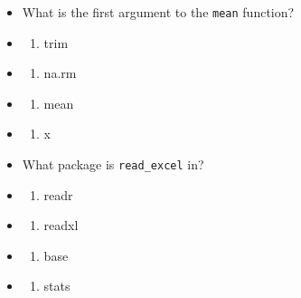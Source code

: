 \documentclass[
  oneside]{book}
\providecommand{\tightlist}{%
  \setlength{\itemsep}{0pt}\setlength{\parskip}{0pt}}
\begin{document}
\begin{try}
\begin{itemize}
\item
  What is the first argument to the \texttt{mean} function?
\item
  \begin{enumerate}
  \def\labelenumi{(\Alph{enumi})}
  \tightlist
  \item
    trim\\
  \end{enumerate}
\item
  \begin{enumerate}
  \def\labelenumi{(\Alph{enumi})}
  \setcounter{enumi}{1}
  \tightlist
  \item
    na.rm\\
  \end{enumerate}
\item
  \begin{enumerate}
  \def\labelenumi{(\Alph{enumi})}
  \setcounter{enumi}{2}
  \tightlist
  \item
    mean\\
  \end{enumerate}
\item
  \begin{enumerate}
  \def\labelenumi{(\Alph{enumi})}
  \setcounter{enumi}{3}
  \tightlist
  \item
    x
  \end{enumerate}
\item
  What package is \texttt{read\_excel} in?
\item
  \begin{enumerate}
  \def\labelenumi{(\Alph{enumi})}
  \tightlist
  \item
    readr\\
  \end{enumerate}
\item
  \begin{enumerate}
  \def\labelenumi{(\Alph{enumi})}
  \setcounter{enumi}{1}
  \tightlist
  \item
    readxl\\
  \end{enumerate}
\item
  \begin{enumerate}
  \def\labelenumi{(\Alph{enumi})}
  \setcounter{enumi}{2}
  \tightlist
  \item
    base\\
  \end{enumerate}
\item
  \begin{enumerate}
  \def\labelenumi{(\Alph{enumi})}
  \setcounter{enumi}{3}
  \tightlist
  \item
    stats
  \end{enumerate}
\end{itemize}

\end{try}
\end{document}
